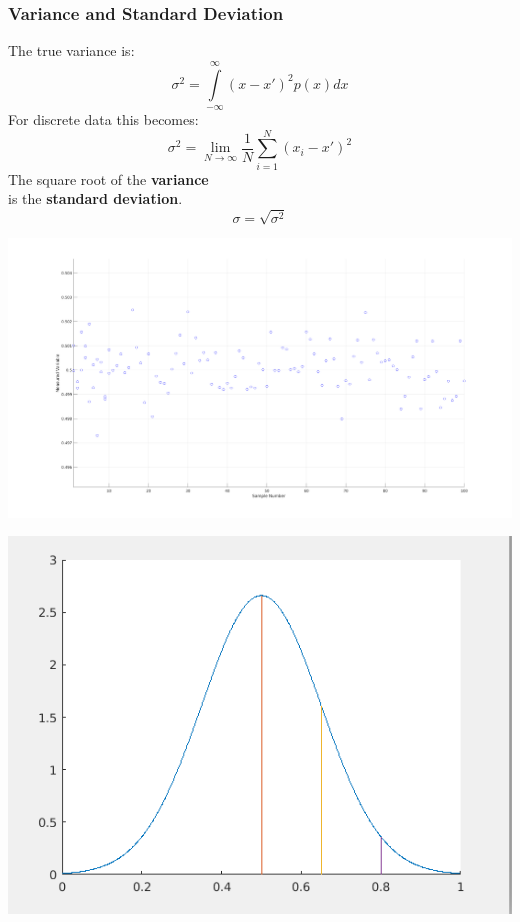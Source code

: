\documentclass[fleqn]{beamer} %
\newcommand{\sectionIIsubsectionIItitle}{Variance and Standard Deviation}
\begin{document}
      \begin{frame}
				\frametitle{\sectionIIsubsectionIItitle}

				\begin{multicols}{2} \scriptsize
				The true variance is:\\
				\[ \sigma^2=\int\limits_{-\infty}^{\infty}(x-x')^2p(x)dx \]
				For discrete data this becomes:\\
				\[ \sigma^2=\lim\limits_{N\rightarrow \infty}\frac{1}{N}\sum\limits_{i=1}^{N}(x_i-x')^2 \]
				The square root of the {\bf \BL variance} \\
				is the {\bf \PR standard deviation}. \\
				\[\sigma=\sqrt{\sigma^2}\]

				\hspace*{-1.5cm}\includegraphics[scale=.20]{images/topic2_measured_fig2.png}		
				
				\end{multicols}

			\end{frame}

			\begin{frame}
				\includegraphics[scale=.50]{images/lecture1_fig1.png}
			\end{frame}
\end{document}

